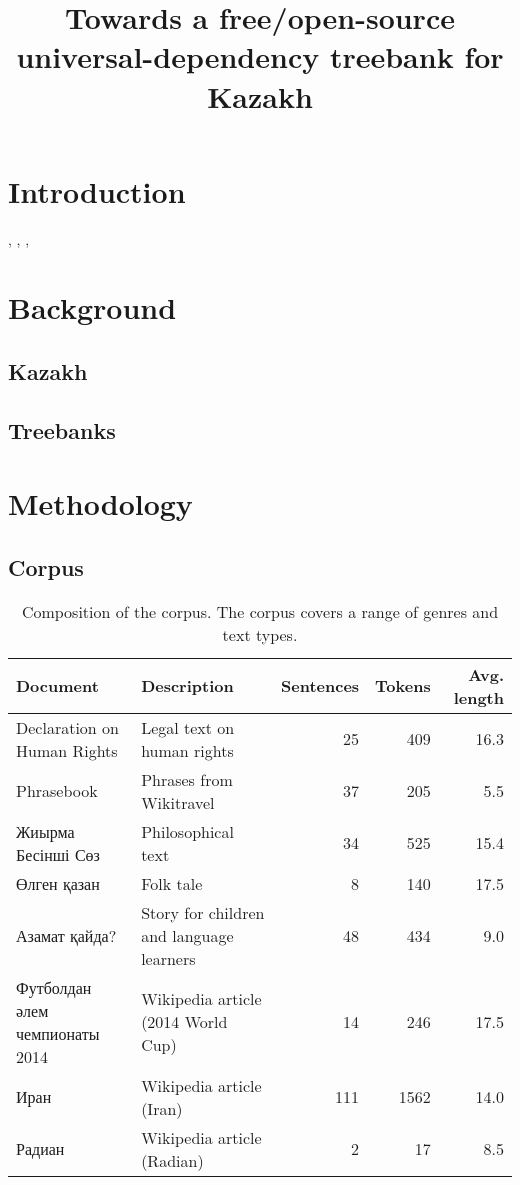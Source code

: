 \documentclass[a4paper,11pt, onecolumn]{article}
\title{Towards a free/open-source universal-dependency treebank for Kazakh}
\begin{document}
\maketitleabstract{}


\section{Introduction}

\citet{Lynn12}, \citet{Atalay03}, \citet{Oflazer03}, \citet{DeMarneffe14}

\section{Background}

\subsection{Kazakh}

\subsection{Treebanks} %

\section{Methodology}

\subsection{Corpus}

\begin{table}
  \centering
  \begin{tabular}{|l|l|r|r|r|}
    \hline
    \textbf{Document} & \textbf{Description} & \textbf{Sentences} & \textbf{Tokens} & \textbf{Avg. length}\\
    \hline
    Declaration on Human Rights & Legal text on human rights & 25 & 409 & 16.3 \\
    Phrasebook & Phrases from Wikitravel & 37 & 205 & 5.5 \\
    Жиырма Бесінші Сөз & Philosophical text & 34 & 525 & 15.4 \\ 
    Өлген қазан & Folk tale & 8 & 140 & 17.5 \\
    Азамат қайда? & Story for children and language learners & 48 & 434 & 9.0 \\
    Футболдан әлем чемпионаты 2014  & Wikipedia article (2014 World Cup) & 14 & 246 & 17.5 \\
    Иран & Wikipedia article (Iran) & 111 & 1562 & 14.0 \\
    Радиан & Wikipedia article (Radian) & 2 & 17 & 8.5 \\
    \hline
  \end{tabular}
  \caption{Composition of the corpus. The corpus covers a range of genres and text types.}
\end{table}
\end{document}
